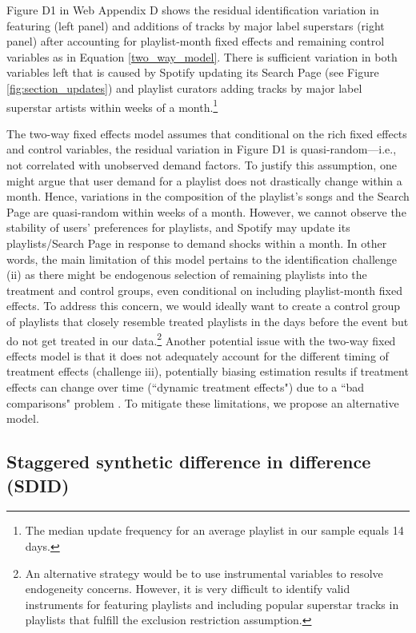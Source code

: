 \documentclass[12pt, a4paper, leqno]{article}
\begin{document}
Figure D1 in Web Appendix D shows the residual identification variation in featuring (left panel) and additions of tracks by major label superstars (right panel) after accounting for playlist-month fixed effects and remaining control variables as in Equation \ref{two_way_model}. There is sufficient variation in both variables left that is caused by Spotify updating its Search Page (see Figure \ref{fig:section_updates}) and playlist curators adding tracks by major label superstar artists within weeks of a month.\footnote{The median update frequency for an average playlist in our sample equals 14 days.}

The two-way fixed effects model assumes that conditional on the rich fixed effects and control variables, the residual variation in Figure D1 is quasi-random---i.e., not correlated with unobserved demand factors. To justify this assumption, one might argue that user demand for a playlist does not drastically change within a month. Hence, variations in the composition of the playlist's songs and the Search Page are quasi-random within weeks of a month. However, we cannot observe the stability of users' preferences for playlists, and Spotify may update its playlists/Search Page in response to demand shocks within a month. 
In other words, the main limitation of this model pertains to the identification challenge (ii) as there might be endogenous selection of remaining playlists into the treatment and control groups, even conditional on including playlist-month fixed effects. To address this concern, we would ideally want to create a control group of playlists that closely resemble treated playlists in the days before the event but do not get treated in our data.\footnote{An alternative strategy would be to use instrumental variables to resolve endogeneity concerns. However, it is very difficult to identify valid instruments for featuring playlists and including popular superstar tracks in playlists that fulfill the exclusion restriction assumption.} Another potential issue with the two-way fixed effects model is that it does not adequately account for the different timing of treatment effects (challenge iii), potentially biasing estimation results if treatment effects can change over time (``dynamic treatment effects") due to a ``bad comparisons" problem \citep{baker2022much}. To mitigate these limitations, we propose an alternative model. 


\subsection{Staggered synthetic difference in difference (SDID)} 
\label{SDID}
\end{document}
